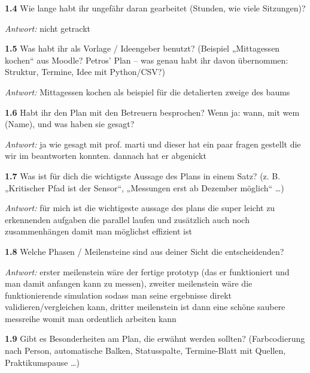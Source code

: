 {\par\noindent \textbf{1.4} Wie lange habt ihr ungefähr daran gearbeitet (Stunden, wie viele Sitzungen)?\par
\par\noindent\emph{Antwort:} nicht getrackt\par\smallskip
\par\noindent \textbf{1.5} Was habt ihr als Vorlage / Ideengeber benutzt? (Beispiel „Mittagessen kochen“ aus Moodle? Petros' Plan – was genau habt ihr davon übernommen: Struktur, Termine, Idee mit Python/CSV?)\par
\par\noindent\emph{Antwort:} Mittagessen kochen als beispiel für die detalierten zweige des baums\par\smallskip
\par\noindent \textbf{1.6} Habt ihr den Plan mit den Betreuern besprochen? Wenn ja: wann, mit wem (Name), und was haben sie gesagt?\par
\par\noindent\emph{Antwort:} ja wie gesagt mit prof. marti und dieser hat ein paar fragen gestellt die wir im beantworten konnten. dannach hat er abgenickt\par\smallskip
\par\noindent \textbf{1.7} Was ist für dich die wichtigste Aussage des Plans in einem Satz? (z. B. „Kritischer Pfad ist der Sensor“, „Messungen erst ab Dezember möglich“ …)\par
\par\noindent\emph{Antwort:} für mich ist die wichtigeste aussage des plans die super leicht zu erkennenden aufgaben die parallel laufen und zusätzlich auch noch zusammenhängen damit man möglichst effizient ist\par\smallskip
\par\noindent \textbf{1.8} Welche Phasen / Meilensteine sind aus deiner Sicht die entscheidenden?\par
\par\noindent\emph{Antwort:} erster meilenstein wäre der fertige prototyp (das er funktioniert und man damit anfangen kann zu messen), zweiter meilenstein wäre die funktionierende simulation sodass man seine ergebnisse direkt validieren/vergleichen kann, dritter meilenstein ist dann eine schöne saubere messreihe womit man ordentlich arbeiten kann\par\smallskip
\par\noindent \textbf{1.9} Gibt es Besonderheiten am Plan, die erwähnt werden sollten? (Farbcodierung nach Person, automatische Balken, Statusspalte, Termine-Blatt mit Quellen, Praktikumspause …)\par
}

